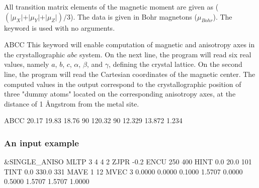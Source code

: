 \begin{keywordlist}
All transition matrix elements of the magnetic moment are given as
($(\vert\mu_{X}\vert+\vert\mu_{Y}\vert+\vert\mu_{Z}\vert)/3$).
The data is given in Bohr magnetons ($\mu_{Bohr}$).
The keyword is used with no arguments.




\item[ABCC]
This keyword will enable computation of magnetic and anisotropy axes in the
crystallographic $abc$ system. On the next line, the program will read six real
values, namely $a$, $b$, $c$,  $\alpha$, $\beta$, and $\gamma$, defining the
crystal lattice. On the second line, the program will read the Cartesian coordinates
of the magnetic center. The computed values in the output correspond to the
crystallographic position of three "dummy atoms" located on the corresponding anisotropy axes, at the distance of 1 {\AA}ngstrom from the metal site.

\begin{inputlisting}
ABCC
20.17   19.83   18.76    90  120.32  90
12.329  13.872  1.234
\end{inputlisting}









\end{keywordlist}

\subsubsection{An input example}
\begin{inputlisting}
&SINGLE_ANISO
MLTP
3
4 4 2
ZJPR
-0.2
ENCU
250 400
HINT
0.0  20.0  101
TINT
0.0  330.0  331
MAVE
1  12
MVEC
3
0.0000  0.0000   0.1000
1.5707  0.0000   0.5000
1.5707  1.5707   1.0000
\end{inputlisting}
